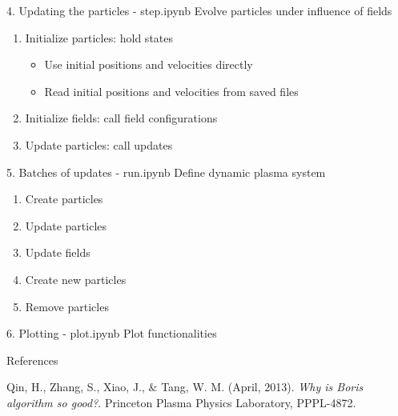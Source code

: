 \documentclass{beamer}
\begin{document}
	\begin{frame}[t]{4. Updating the particles - step.ipynb}
		Evolve particles under influence of fields
		\vspace{0.5cm}
		\begin{enumerate}
			\item Initialize particles: hold states \\
			\begin{itemize}
				\item Use initial positions and velocities directly
				\item Read initial positions and velocities from saved files
			\end{itemize}
			\item Initialize fields: call field configurations
			\item Update particles: call updates
		\end{enumerate}
	\end{frame}
	\begin{frame}
		
	\end{frame}
	\begin{frame}
		
	\end{frame}
	\begin{frame}
		
	\end{frame}

	\begin{frame}[t]{5. Batches of updates - run.ipynb}
		Define dynamic plasma system
		\vspace{0.5cm}
		\begin{enumerate}
			\item Create particles
			\item Update particles
			\item Update fields
			\item Create new particles
			\item Remove particles
		\end{enumerate}
	\end{frame}
	\begin{frame}
		
	\end{frame}
	\begin{frame}
		
	\end{frame}

	\begin{frame}[t]{6. Plotting - plot.ipynb}
		Plot functionalities
	\end{frame}

	\begin{frame}[t]{References}
	\begin{thebibliography}{}
		Qin, H., Zhang, S., Xiao, J., $\&$ Tang, W. M. (April, 2013). \textit{Why is Boris algorithm so good?}. Princeton Plasma Physics Laboratory, PPPL-4872.
		
	\end{thebibliography}
	\end{frame}
\end{document}
